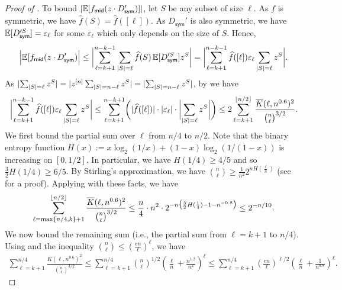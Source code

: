 \documentclass[10pt,a4paper]{article}
\theoremstyle{definition}
\newcommand{\E}{\mathop{\mathbb{E}\/}}
\newcommand{\eps}{\epsilon}
\newcommand{\wh}[1]{\widehat{#1}}
\newcommand{\ol}[1]{\overline{#1}}
\newcommand{\hf}{\wh{f}}
\DeclarePairedDelimiter\abs{\lvert}{\rvert}
\DeclarePairedDelimiter\floor{\lfloor}{\rfloor}
\def\sym{\mathsf{sym}}
\def\middle{\mathsf{mid}}
\def\sK{\ol{K}}
\def\epsilon{\varepsilon}
\begin{document}
\begin{proof}[Proof of ]
  To bound $\abs{\E[f_\middle(z \cdot D_\sym')]}$, let $S$ be any subset of size $\ell$.
  As $f$ is symmetric, we have $\hf(S) = \hf([\ell])$.
  As $D_\sym'$ is also symmetric, we have $\E[D_\sym'^S] = \eps_\ell$ for some $\eps_\ell$ which only depends on the size of $S$.
  Hence,
  \begin{align*}
  \abs[\Big]{\E[f_{\middle}(z \cdot D_\sym')}
  \le  \abs[\bigg]{ \sum_{\ell=k+1}^{n-k-1} \sum_{\abs{S}=\ell} \hf(S) \E[D_\sym'^S] z^S }
  =  \abs[\bigg]{\sum_{\ell=k+1}^{n-k-1} \hf([\ell]) \eps_\ell \sum_{\abs{S}=\ell} z^S } .
  \end{align*}
  As $\abs{\sum_{\abs{S}=\ell} z^S} = \abs{ z^{[n]} \sum_{\abs{S}=n-\ell} z^S} = \abs{\sum_{\abs{S}=n-\ell} z^S}$, by  we have
  \[
    \abs[\bigg]{ \sum_{\ell=k+1}^{n-k-1} \hf([\ell]) \eps_\ell \sum_{\abs{S}=\ell} z^S }
  \le \sum_{\ell=k+1}^{n-k+1} \biggl( \abs{\hf([\ell])} \cdot \abs{\eps_\ell} \cdot \abs[\bigg]{\sum_{\abs{S}=\ell} z^S} \biggr) \\
  \le 2 \sum_{\ell=k+1}^{\floor{n/2}} \frac{\sK(\ell,n^{0.6})^2}{\binom{n}{\ell}^{3/2}} .
  \]
  We first bound the partial sum over $\ell$ from $n/4$ to $n/2$.
  Note that the binary entropy function $H(x) := x \log_2(1/x) + (1-x) \log_2(1/(1-x))$ is increasing on $[0,1/2]$.
  In particular, we have $H(1/4) \ge 4/5$ and so $\frac{3}{2}H(1/4) \ge 6/5$.
  By Stirling's approximation, we have $\binom{n}{\ell} \ge \frac{1}{n^2} 2^{n H(\frac{\ell}{n})}$ (see \cite{CT06} for a proof).
  Applying  with these facts, we have
  \begin{align}
    \sum_{\ell=\max\{n/4,k\}+1}^{\floor{n/2}} \frac{\sK(\ell,n^{0.6})^2}{\binom{n}{\ell}^{3/2}}
    \le \frac{n}{4} \cdot n^2 \cdot 2^{-n \bigl( \frac{3}{2} H(\frac{1}{4})- 1 - n^{-0.8} \bigr) }
    \le 2^{-n/10} .
  \end{align}  
  We now bound the remaining sum (i.e., the partial sum from $\ell=k+1$ to $n/4$).
  Using  and the inequality $\binom{n}{\ell} \le (\frac{en}{\ell})^\ell$, we have
  \begin{align*}
    \sum_{\ell=k+1}^{n/4} \frac{\sK(\ell,n^{0.6})^2}{\binom{n}{\ell}^{3/2}}
    \le \sum_{\ell=k+1}^{n/4} \binom{n}{\ell}^{1/2} \left( \frac{\ell}{n} + \frac{n^{1.2}}{n^2} \right)^{\ell}
    \le \sum_{\ell=k+1}^{n/4} \left(\frac{en}{\ell}\right)^{\ell/2} \left( \frac{\ell}{n} + \frac{1}{n^{0.8}} \right)^{\ell} .

\end{align*}
\end{proof}
\end{document}
